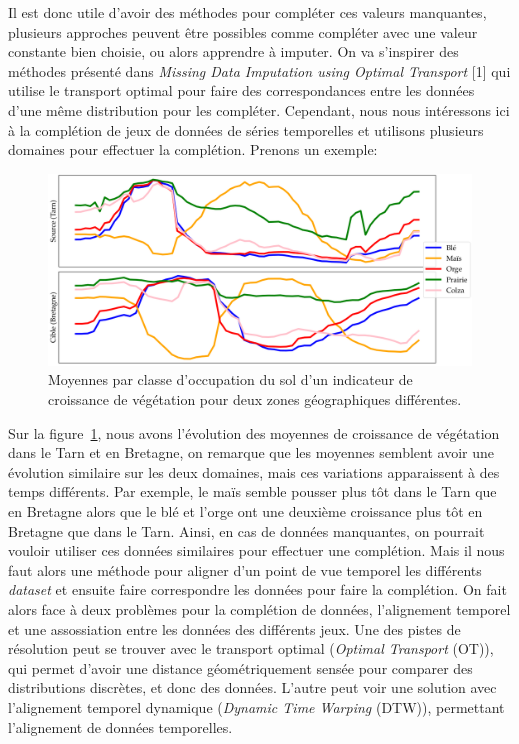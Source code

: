 \documentclass[acmsmall, natbib=false, nonacm]{acmart}
\begin{document}
Il est donc utile d’avoir des méthodes pour compléter ces valeurs manquantes, 
plusieurs approches peuvent être possibles comme compléter avec une valeur constante bien choisie,
ou alors apprendre à imputer.
On va s'inspirer des méthodes présenté dans \textit{Missing Data Imputation using Optimal Transport} [1] qui utilise le transport optimal pour faire des correspondances entre les données d'une même distribution pour les compléter.
Cependant, nous nous intéressons ici à la complétion de jeux de données de séries temporelles et utilisons plusieurs domaines pour effectuer la complétion.
Prenons un exemple:
\begin{figure}[H]
    \centering
    \includegraphics[scale = 0.3]{images/exemple_serie_temps.png}
    \caption{Moyennes par classe d'occupation du sol d'un indicateur de croissance de végétation pour deux zones géographiques différentes.}
    \label{exemple_intro}
\end{figure}
Sur la figure~\ref{exemple_intro}, nous avons l'évolution des moyennes de croissance de végétation dans le Tarn et en Bretagne, 
on remarque que les moyennes semblent avoir une évolution similaire sur les deux domaines, 
mais ces variations apparaissent à des temps différents. 
Par exemple, le maïs semble pousser plus tôt dans le Tarn que en Bretagne alors que le blé et l'orge ont une deuxième croissance plus tôt en Bretagne que dans le Tarn. 
Ainsi, en cas de données manquantes, on pourrait vouloir utiliser ces données similaires pour effectuer une complétion. 
Mais il nous faut alors une méthode pour aligner d'un point de vue temporel les différents \textit{dataset} et ensuite faire correspondre les données pour faire la complétion.
On fait alors face à deux problèmes pour la complétion de données, l'alignement temporel et une assossiation entre les données des différents jeux.
Une des pistes de résolution peut se trouver avec le transport optimal (\textit{Optimal Transport} (OT)), qui permet d'avoir une distance géométriquement sensée pour comparer des distributions discrètes, et donc des données.
L'autre peut voir une solution avec l'alignement temporel dynamique (\textit{Dynamic Time Warping} (DTW)), permettant l'alignement de données temporelles.
\end{document}
